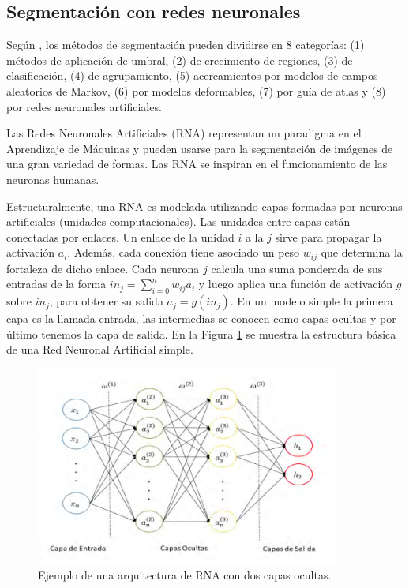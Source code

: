 \subsection{Segmentación con redes neuronales}\label{sec:nn}

Según \cite{pham2000survey}, los métodos de segmentación pueden dividirse en 8 categorías: (1) métodos de aplicación de umbral, (2) de crecimiento de regiones, (3) de clasificación, (4) de agrupamiento, (5) acercamientos por modelos de campos aleatorios de Markov, (6) por modelos deformables, (7) por guía de atlas y (8) por redes neuronales artificiales.

Las Redes Neuronales Artificiales (RNA) representan un paradigma en el Aprendizaje de Máquinas y pueden usarse para la segmentación de imágenes de una gran variedad de formas. Las RNA se inspiran en el funcionamiento de las neuronas humanas.

Estructuralmente, una RNA es modelada utilizando capas formadas por neuronas artificiales (unidades computacionales). Las unidades entre capas están conectadas por enlaces. Un enlace de la unidad $i$ a la $j$ sirve para propagar la activación $a_i$. Además, cada conexión tiene asociado un peso $w_{ij}$ que determina la fortaleza de dicho enlace. Cada neurona $j$ calcula una suma ponderada de sus entradas de la forma $in_j = \displaystyle\sum_{i = 0}^{n} w_{ij}a_i$ y luego aplica una función de activación $g$ sobre $in_j$, para obtener su salida $a_j = g(in_j)$. En un modelo simple la primera capa es la llamada entrada, las intermedias se conocen como capas ocultas y por último tenemos la capa de salida. En la Figura \ref{fig:rna} se muestra la estructura básica de una Red Neuronal Artificial simple.

\begin{figure}[ht]
	\centering
	\includegraphics[width=10cm]{./Graphics/rna.png}
	\caption{Ejemplo de una arquitectura de RNA con dos capas ocultas.}
	\label{fig:rna}
\end{figure}

